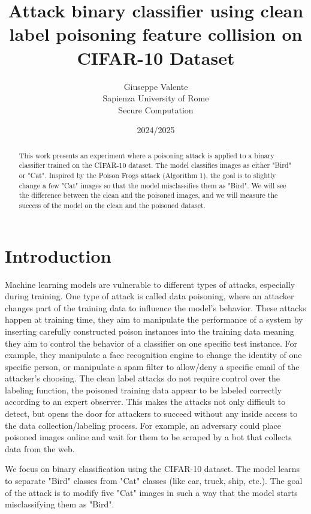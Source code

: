 \documentclass{article}
\author{Giuseppe Valente \\ Sapienza University of Rome \\ Secure Computation\\}
\date{2024/2025}
\title{Attack binary classifier using clean label poisoning feature collision on CIFAR-10 Dataset\\}
\begin{document}
\maketitle

\newpage

\tableofcontents

\newpage

\begin{abstract}
This work presents an experiment where a poisoning attack is applied to a binary classifier trained on the CIFAR-10 dataset. 
The model classifies images as either "Bird" or "Cat". Inspired by the Poison Frogs attack (Algorithm 1), the goal is to slightly change a few "Cat" images so that the model misclassifies them as "Bird". 
We will see the difference between the clean and the poisoned images, and we will measure the success of the model on the clean and the poisoned dataset.
\end{abstract}

\section{Introduction}
Machine learning models are vulnerable to different types of attacks, especially during training. One type of attack is called data poisoning, where an attacker changes part of the training data to influence the model’s behavior. These attacks happen at training time, they aim to manipulate
the performance of a system by inserting carefully constructed poison instances into the training data meaning they aim to control the behavior of a classifier on one specific test instance. For example, they manipulate a face recognition
engine to change the identity of one specific person, or manipulate a spam filter to allow/deny a
specific email of the attacker’s choosing. The clean label attacks do not require control over the labeling function, the poisoned training data appear to be labeled correctly according to an expert observer. This makes the attacks not only difficult to detect, but opens the door for attackers to
succeed without any inside access to the data collection/labeling process. For example, an adversary could place poisoned images online and wait for them to be scraped by a bot that collects data from the web.

We focus on binary classification using the CIFAR-10 dataset. The model learns to separate "Bird" classes from "Cat" classes (like car, truck, ship, etc.). The goal of the attack is to modify five "Cat" images in such a way that the model starts misclassifying them as "Bird".
\end{document}
